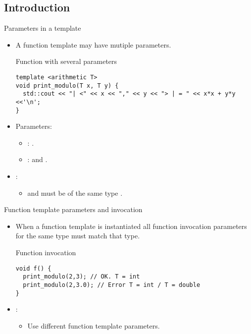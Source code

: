 \subsection{Introduction}

\begin{frame}[t,fragile]{Parameters in a template}
\begin{itemize}
  \item A function template may have mutiple parameters.

\begin{block}{Function with several parameters}
\begin{lstlisting}
template <arithmetic T>
void print_modulo(T x, T y) {
  std::cout << "| <" << x << "," << y << "> | = " << x*x + y*y <<'\n';
}
\end{lstlisting}
\end{block}

  \item Parameters:
    \begin{itemize}
      \item {}: .
      \item {}:  and .
    \end{itemize}

  \item {}:
    \begin{itemize}
      \item {} and  must be of the same type .
    \end{itemize}

\end{itemize}
\end{frame}

\begin{frame}[t,fragile]{Function template parameters and invocation}
\begin{itemize}
  \item When a function template is instantiated all function invocation parameters
        for the same type must match that type.

\begin{block}{Function invocation}
\begin{lstlisting}
void f() {
  print_modulo(2,3); // OK. T = int
  print_modulo(2,3.0); // Error T = int / T = double
}
\end{lstlisting}
\end{block}

  \item {}:
    \begin{itemize}
      \item Use different function template parameters.
    \end{itemize}
\end{itemize}
\end{frame}
